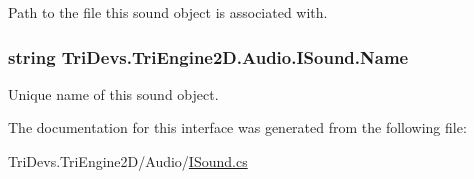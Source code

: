 Path to the file this sound object is associated with. 

\hypertarget{interface_tri_devs_1_1_tri_engine2_d_1_1_audio_1_1_i_sound_a2307573aedd92969cf3d051b395c5bc0}{
\subsubsection[{Name}]{\setlength{\rightskip}{0pt plus 5cm}string Tri\-Devs.\-Tri\-Engine2\-D.\-Audio.\-I\-Sound.\-Name\hspace{0.3cm}{\ttfamily [get]}}}\label{interface_tri_devs_1_1_tri_engine2_d_1_1_audio_1_1_i_sound_a2307573aedd92969cf3d051b395c5bc0}


Unique name of this sound object. 



The documentation for this interface was generated from the following file\-:\begin{DoxyCompactItemize}
\item 
Tri\-Devs.\-Tri\-Engine2\-D/\-Audio/\hyperlink{_i_sound_8cs}{I\-Sound.\-cs}\end{DoxyCompactItemize}
